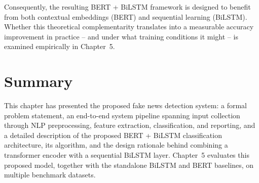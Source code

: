 Consequently, the resulting BERT + BiLSTM framework is designed to benefit from both contextual embeddings (BERT) and sequential learning (BiLSTM). Whether this theoretical complementarity translates into a measurable accuracy improvement in practice -- and under what training conditions it might -- is examined empirically in Chapter~5.

\section{Summary}

This chapter has presented the proposed fake news detection system: a formal problem statement, an end-to-end system pipeline spanning input collection through NLP preprocessing, feature extraction, classification, and reporting, and a detailed description of the proposed BERT + BiLSTM classification architecture, its algorithm, and the design rationale behind combining a transformer encoder with a sequential BiLSTM layer. Chapter~5 evaluates this proposed model, together with the standalone BiLSTM and BERT baselines, on multiple benchmark datasets.
